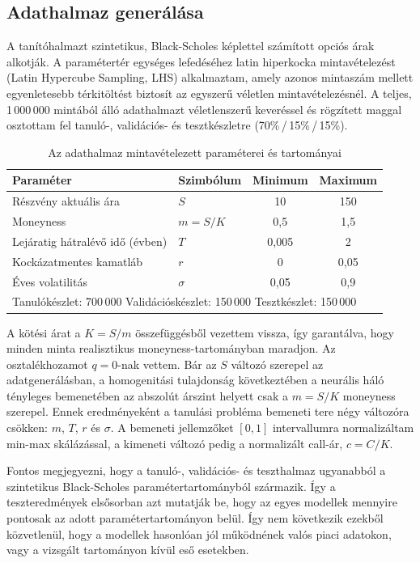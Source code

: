 \subsection{Adathalmaz generálása}

A tanítóhalmazt szintetikus, Black-Scholes képlettel számított opciós árak
alkotják.
A paramétertér egységes lefedéséhez latin hiperkocka mintavételezést (Latin Hypercube
Sampling, LHS) \cite{mckay1979} alkalmaztam, amely azonos mintaszám mellett
egyenletesebb térkitöltést biztosít az egyszerű véletlen mintavételezésnél.
A teljes, 1\,000\,000 mintából álló adathalmazt véletlenszerű keveréssel
és rögzített maggal osztottam fel tanuló-,
validációs- és tesztkészletre (70\%\,/\,15\%\,/\,15\%).

\begin{table}[H]
\centering
\caption{Az adathalmaz mintavételezett paraméterei és tartományai}
\label{tab:params}
\begin{tabular}{llcc}
\toprule
Paraméter & Szimbólum & Minimum & Maximum \\
\midrule
Részvény aktuális ára & $S$ & 10 & 150 \\
Moneyness & $m = S/K$ & 0{,}5 & 1{,}5 \\
Lejáratig hátralévő idő (évben) & $T$ & 0{,}005 & 2 \\
Kockázatmentes kamatláb & $r$ & 0 & 0{,}05 \\
Éves volatilitás & $\sigma$ & 0{,}05 & 0{,}9 \\
\midrule
\multicolumn{4}{l}{\small Tanulókészlet: 700\,000 \quad Validációskészlet: 150\,000 \quad Tesztkészlet: 150\,000}\\
\bottomrule
\end{tabular}
\end{table}

A kötési árat a $K=S/m$ összefüggésből vezettem vissza, így garantálva, hogy minden minta realisztikus moneyness-tartományban maradjon. Az osztalékhozamot $q=0$-nak vettem. Bár az $S$ változó szerepel az adatgenerálásban, a homogenitási tulajdonság következtében a neurális háló tényleges bemenetében az abszolút árszint helyett csak a $m=S/K$ moneyness szerepel. Ennek eredményeként a tanulási probléma bemeneti tere négy változóra csökken: $m$, $T$, $r$ és $\sigma$. A bemeneti jellemzőket $[0,1]$ intervallumra normalizáltam min-max skálázással, a kimeneti változó pedig a normalizált call-ár, $c=C/K$.

Fontos megjegyezni, hogy a tanuló-, validációs- és teszthalmaz ugyanabból a szintetikus Black-Scholes paramétertartományból származik. Így a teszteredmények elsősorban azt mutatják be, hogy az egyes modellek mennyire pontosak az adott paramétertartományon belül. Így nem következik ezekből közvetlenül, hogy a modellek hasonlóan jól működnének valós piaci adatokon, vagy a vizsgált tartományon kívül eső esetekben.

